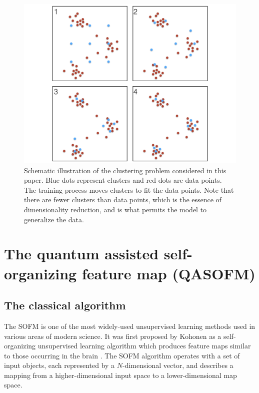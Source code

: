 \documentclass[pra,showkeys,twocolumn,showpacs]{revtex4-1}
\begin{document}
\begin{figure}
  	\includegraphics[width=0.95\columnwidth]{sofm_fitting.png}
	\caption{
		Schematic illustration of the clustering problem considered in this paper.  
		Blue dots represent clusters and red dots are data points. 
		The training process moves clusters to fit the data points. 
		Note that there are fewer clusters than data points, 
		which is the essence of dimensionality reduction, 
		and is what permits the model to generalize the data.
	}
	\label{fig:sofm_fitting}
\end{figure}


























\section{The quantum assisted self-organizing feature map (QASOFM)}
\label{sec:qasofm}



\subsection{The classical algorithm}


The SOFM is one of the most widely-used unsupervised learning methods used in various areas of modern science. 
It was first proposed by Kohonen as a self-organizing unsupervised learning algorithm which produces feature maps similar to those occurring in the brain \cite{solan2001}. 
The SOFM algorithm operates with a set of input objects, each represented by a $N$-dimensional vector, 
and describes a mapping from a higher-dimensional input space to a lower-dimensional map space.
\end{document}
